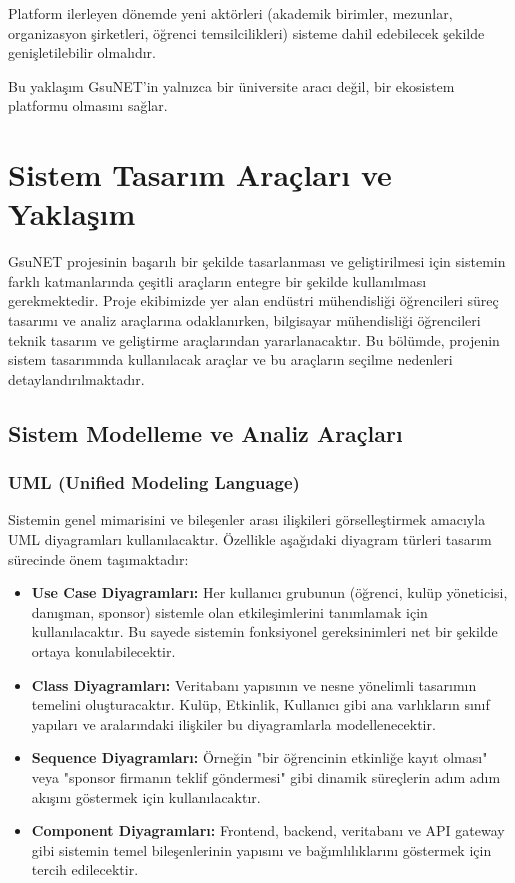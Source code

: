 \documentclass[a4paper,12pt]{report}
\begin{document}
Platform ilerleyen dönemde yeni aktörleri (akademik birimler, mezunlar, organizasyon şirketleri, öğrenci temsilcilikleri) sisteme dahil edebilecek şekilde genişletilebilir olmalıdır.

Bu yaklaşım GsuNET’in yalnızca bir üniversite aracı değil, bir ekosistem platformu olmasını sağlar.

\chapter{Sistem Tasarım Araçları ve Yaklaşım}


GsuNET projesinin başarılı bir şekilde tasarlanması ve geliştirilmesi için sistemin farklı katmanlarında çeşitli araçların entegre bir şekilde kullanılması gerekmektedir. Proje ekibimizde yer alan endüstri mühendisliği öğrencileri süreç tasarımı ve analiz araçlarına odaklanırken, bilgisayar mühendisliği öğrencileri teknik tasarım ve geliştirme araçlarından yararlanacaktır. Bu bölümde, projenin sistem tasarımında kullanılacak araçlar ve bu araçların seçilme nedenleri detaylandırılmaktadır.

\section{Sistem Modelleme ve Analiz Araçları}

\subsection{UML (Unified Modeling Language)}

Sistemin genel mimarisini ve bileşenler arası ilişkileri görselleştirmek amacıyla UML diyagramları kullanılacaktır. Özellikle aşağıdaki diyagram türleri tasarım sürecinde önem taşımaktadır:

\begin{itemize}
    \item \textbf{Use Case Diyagramları:} Her kullanıcı grubunun (öğrenci, kulüp yöneticisi, danışman, sponsor) sistemle olan etkileşimlerini tanımlamak için kullanılacaktır. Bu sayede sistemin fonksiyonel gereksinimleri net bir şekilde ortaya konulabilecektir.

    \item \textbf{Class Diyagramları:} Veritabanı yapısının ve nesne yönelimli tasarımın temelini oluşturacaktır. Kulüp, Etkinlik, Kullanıcı gibi ana varlıkların sınıf yapıları ve aralarındaki ilişkiler bu diyagramlarla modellenecektir.

    \item \textbf{Sequence Diyagramları:} Örneğin "bir öğrencinin etkinliğe kayıt olması" veya "sponsor firmanın teklif göndermesi" gibi dinamik süreçlerin adım adım akışını göstermek için kullanılacaktır.

    \item \textbf{Component Diyagramları:} Frontend, backend, veritabanı ve API gateway gibi sistemin temel bileşenlerinin yapısını ve bağımlılıklarını göstermek için tercih edilecektir.
\end{itemize}
\end{document}
